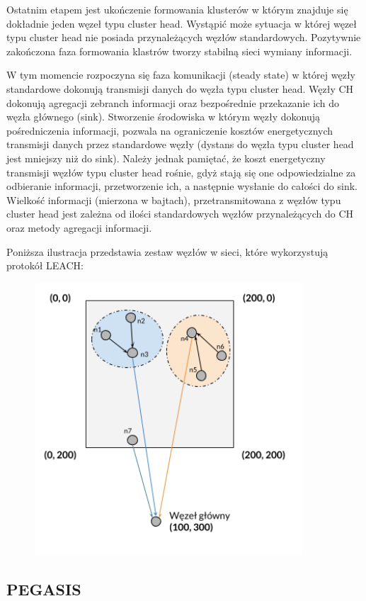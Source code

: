 \documentclass[a4paper,12pt,twoside,openany]{report}
\begin{document}
Ostatnim etapem jest ukończenie formowania klusterów w którym znajduje się dokładnie jeden węzeł typu cluster head.
Wystąpić może sytuacja w której węzeł typu cluster head nie posiada przynależących węzłów standardowych.
Pozytywnie zakończona faza formowania klastrów tworzy stabilną sieci wymiany informacji.

W tym momencie rozpoczyna się faza komunikacji (steady state) w której węzły standardowe dokonują transmisji danych do  węzła typu cluster head.
Węzły CH dokonują agregacji zebranch informacji oraz bezpośrednie przekazanie ich do węzła głównego (sink).
Stworzenie środowiska w którym węzły dokonują pośredniczenia informacji, pozwala na ograniczenie kosztów energetycznych transmisji danych przez
standardowe węzły (dystans do węzła typu cluster head jest mniejszy niż do sink). Należy jednak pamiętać, że koszt energetyczny transmisji węzłów typu cluster head rośnie, gdyż
stają się one odpowiedzialne za odbieranie informacji, przetworzenie ich, a następnie wysłanie do całości do sink. Wielkość informacji (mierzona w bajtach), przetransmitowana 
z węzłów typu cluster head jest zależna od ilości standardowych węzłów przynależących do CH oraz metody agregacji informacji.

Poniższa ilustracja przedstawia zestaw węzłów w sieci, które wykorzystują protokół LEACH:

\begin{figure}[H]
 \centering
 \includegraphics[width=10cm]{images/komunikacja_leach.png} 
\end{figure}

\subsection{PEGASIS}
\end{document}
